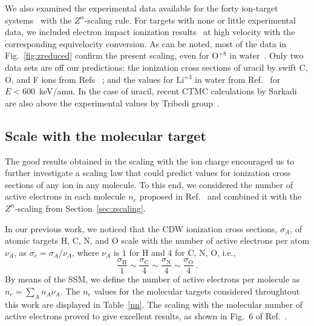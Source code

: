 \documentclass[10pt,showpacs,showkeys,twocolumn]{revtex4-1}
\begin{document}
We also examined the experimental data available for the forty 
ion-target systems~\cite{itoh2013,iriki2011,wolff2014,wang2016,
tribedi2019,agnihotri2012,agnihotri2013,Luna2007,Rudd86,Rudd85,pRudd85,
toburen80,Ohsawa05,Bhattacharjee17,Luna_Li_water,DalCappello2009,
Tribedi_O_water} with the $Z^\alpha$-scaling rule. For targets with none or little experimental data, we included
electron impact ionization results~\cite{rahman2016,bug2017,wolf2019,
fuss2009} at high velocity with the corresponding equivelocity 
conversion.
As can be noted, 
most of the data in Fig.~\ref{fig:zreduced} confirm the present 
scaling, even for O$^{+8}$ in water~\cite{Tribedi_O_water}. 
Only two data sets are off our predictions: the ionization cross sections of 
uracil by swift C, O, and F ions from 
Refs~\cite{agnihotri2012,agnihotri2013}%
; and the values 
for Li$^{+3}$ in water from Ref.~\cite{Luna_Li_water} %
for $E<600$~keV/amu. 
In the case of uracil, recent CTMC calculations by Sarkadi~\cite{sarkadi2016} are also above the experimental values by Tribedi group~\cite{agnihotri2012,agnihotri2013}.


\subsection{Scale with the molecular target}

The good results obtained in the scaling with the ion charge 
encouraged us to further investigate a scaling law that could 
predict values for ionization cross sections of any ion in any 
molecule. To this end, we considered the number of active electrons 
in each molecule $n_e$ proposed in Ref.~\cite{MendezJPB20} and combined 
it with the $Z^\alpha$-scaling from Section~\ref{sec:zscaling}.

In our previous work, we noticed that the CDW ionization cross 
sections, $\sigma_A$, of atomic targets H, C, N, and O  scale with the number of
active electrons per atom $\nu_A$, as \mbox{$\sigma_e=\sigma_A/\nu_A$,} 
where $\nu_A$ is $1$ for H and $4$ for C, N, O, i.e.,
\begin{equation}
 \frac{\sigma_{\mathrm{H}}}{1}\sim
 \frac{\sigma_{\mathrm{C}}}{4}\sim
 \frac{\sigma_{\mathrm{N}}}{4}\sim
 \frac{\sigma_{\mathrm{O}}}{4}\,.
\end{equation}
By %
means of the SSM, we define the number of active electrons per
molecule as $n_e=\sum_A n_A \nu_A$. The $n_e$ values for the 
molecular targets considered throughtout this work are displayed in 
Table~\ref{nn}. The scaling with the molecular number of active
electrons proved to give excellent results, as shown in Fig.~6 of 
Ref.~\cite{MendezJPB20}.
\end{document}
